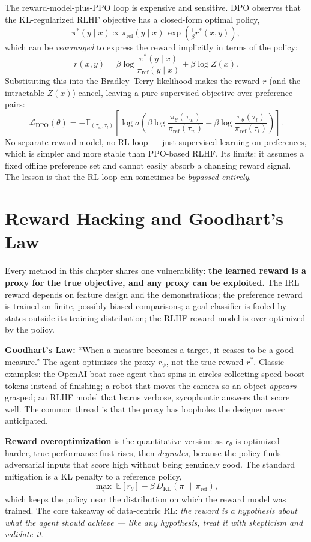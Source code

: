 \documentclass[11pt, oneside]{book}
\newcommand{\E}{\mathbb{E}}              %
\newcommand{\KL}[2]{D_{\mathrm{KL}}\!\left(#1 \,\|\, #2\right)}
\newcommand{\loss}{\mathcal{L}}          %
\newcommand{\params}{\boldsymbol{\theta}}   %
\begin{document}
The reward-model-plus-PPO loop is expensive and sensitive. DPO observes that the
KL-regularized RLHF objective has a closed-form optimal policy,
\[
  \pi^*(y\mid x) \propto \pi_{\text{ref}}(y\mid x)\,\exp\!\left(\tfrac{1}{\beta} r^*(x,y)\right),
\]
which can be \emph{rearranged} to express the reward implicitly in terms of the policy:
\[
  r(x,y) = \beta \log \frac{\pi^*(y\mid x)}{\pi_{\text{ref}}(y\mid x)} + \beta\log Z(x).
\]
Substituting this into the Bradley--Terry likelihood makes the reward $r$ (and the
intractable $Z(x)$) cancel, leaving a pure supervised objective over preference pairs:
\[
  \loss_{\text{DPO}}(\theta) = -\E_{(\tau_w, \tau_l)}\!\left[
    \log \sigma\!\left(\beta \log \frac{\pi_\theta(\tau_w)}{\pi_{\text{ref}}(\tau_w)}
      - \beta \log \frac{\pi_\theta(\tau_l)}{\pi_{\text{ref}}(\tau_l)}\right)\right].
\]
No separate reward model, no RL loop --- just supervised learning on preferences, which is
simpler and more stable than PPO-based RLHF. Its limits: it assumes a fixed offline
preference set and cannot easily absorb a changing reward signal. The lesson is that the
RL loop can sometimes be \emph{bypassed entirely}.

\section{Reward Hacking and Goodhart's Law}

Every method in this chapter shares one vulnerability: \textbf{the learned reward is a
proxy for the true objective, and any proxy can be exploited.} The IRL reward depends on
feature design and the demonstrations; the preference reward is trained on finite,
possibly biased comparisons; a goal classifier is fooled by states outside its training
distribution; the RLHF reward model is over-optimized by the policy.

\begin{intbox}
\textbf{Goodhart's Law:} ``When a measure becomes a target, it ceases to be a good
measure.'' The agent optimizes the proxy $r_\psi$, not the true reward $r^*$. Classic
examples: the OpenAI boat-race agent that spins in circles collecting speed-boost tokens
instead of finishing; a robot that moves the camera so an object \emph{appears} grasped;
an RLHF model that learns verbose, sycophantic answers that score well. The common thread
is that the proxy has loopholes the designer never anticipated.
\end{intbox}

\textbf{Reward overoptimization} is the quantitative version: as $r_\theta$ is optimized
harder, true performance first rises, then \emph{degrades}, because the policy finds
adversarial inputs that score high without being genuinely good. The standard mitigation
is a KL penalty to a reference policy,
\[
  \max_\pi\; \E[r_\theta] - \beta\,\KL{\pi}{\pi_{\text{ref}}},
\]
which keeps the policy near the distribution on which the reward model was trained.
The core takeaway of data-centric RL: \emph{the reward is a hypothesis about what the
agent should achieve --- like any hypothesis, treat it with skepticism and validate it.}
\end{document}
